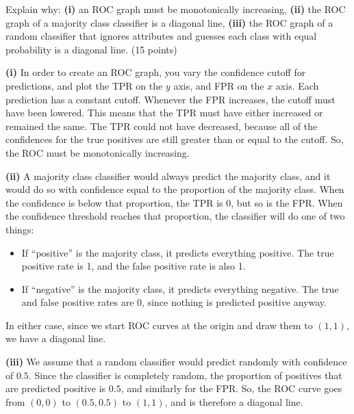 \documentclass[fleqn]{homework}
\begin{document}
  \begin{problem}{4}
    \begin{question}
      Explain why: \textbf{(i)} an ROC graph must be monotonically increasing,
      \textbf{(ii)} the ROC graph of a majority class classifier is a diagonal
      line, \textbf{(iii)} the ROC graph of a random classifier that ignores
      attributes and guesses each class with equal probability is a diagonal
      line. (15 points)
    \end{question}

    \textbf{(i)} In order to create an ROC graph, you vary the confidence cutoff
    for predictions, and plot the TPR on the $y$ axis, and FPR on the $x$ axis.
    Each prediction has a constant cutoff.  Whenever the FPR increases, the
    cutoff must have been lowered.  This means that the TPR must have either
    increased or remained the same.  The TPR could not have decreased, because
    all of the confidences for the true positives are still greater than or
    equal to the cutoff.  So, the ROC must be monotonically increasing.

    \textbf{(ii)} A majority class classifier would always predict the majority
    class, and it would do so with confidence equal to the proportion of the
    majority class.  When the confidence is below that proportion, the TPR is 0,
    but so is the FPR.  When the confidence threshold reaches that proportion,
    the classifier will do one of two things:
    \begin{itemize}
    \item If ``positive'' is the majority class, it predicts everything
      positive.  The true positive rate is 1, and the false positive rate is
      also 1.
    \item If ``negative'' is the majority class, it predicts everything
      negative.  The true and false positive rates are 0, since nothing is
      predicted positive anyway.
    \end{itemize}
    In either case, since we start ROC curves at the origin and draw them to
    $(1,1)$, we have a diagonal line.

    \textbf{(iii)} We assume that a random classifier would predict randomly
    with confidence of $0.5$.  Since the classifier is completely random, the
    proportion of positives that are predicted positive is $0.5$, and similarly
    for the FPR.  So, the ROC curve goes from $(0,0)$ to $(0.5, 0.5)$ to
    $(1,1)$, and is therefore a diagonal line.
  \end{problem}
\end{document}
